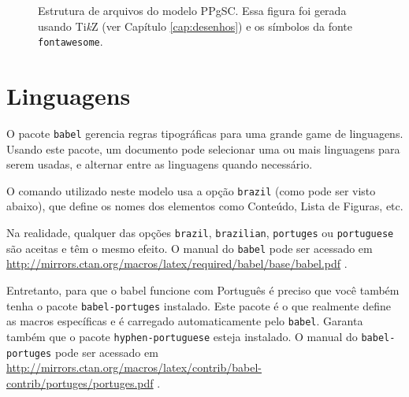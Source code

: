 \begin{figure}
\begin{center}
\end{center}
\caption{Estrutura de arquivos do modelo PPgSC. Essa figura foi gerada usando Ti\textit{k}Z (ver Capítulo \ref{cap:desenhos}) e os símbolos da fonte \texttt{fontawesome}.}
\label{fig:est-arq}
\end{figure}

\section{Linguagens}

O pacote \texttt{babel} gerencia regras tipográficas para uma grande game de linguagens. Usando este pacote, um documento pode selecionar uma ou mais linguagens para serem usadas, e alternar entre as linguagens quando necessário. 

O comando utilizado neste modelo usa a opção \texttt{brazil} (como pode ser visto abaixo), que define os nomes dos elementos como Conteúdo, Lista de Figuras, etc.


Na realidade, qualquer das opções \texttt{brazil}, \texttt{brazilian}, \texttt{portuges} ou \texttt{portuguese} são aceitas e têm o mesmo efeito. O manual do \texttt{babel} pode ser acessado em \url{http://mirrors.ctan.org/macros/latex/required/babel/base/babel.pdf} \parencite{babel}.

Entretanto, para que o babel funcione com Português é preciso que você também tenha o pacote \texttt{babel-portuges} instalado. Este pacote é o que realmente define as macros específicas e é carregado automaticamente pelo \texttt{babel}. Garanta também que o pacote \texttt{hyphen-portuguese} esteja instalado. O manual do \texttt{babel-portuges} pode ser acessado em \url{http://mirrors.ctan.org/macros/latex/contrib/babel-contrib/portuges/portuges.pdf} \parencite{babel-portuges}.

